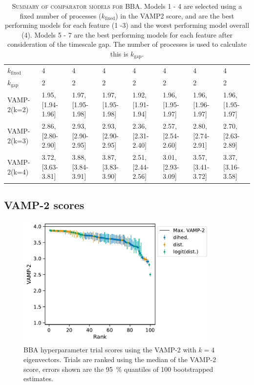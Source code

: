 \documentclass{article}
\begin{document}
\begin{landscape}
\begin{table}
\begin{tabular}{llllllll}
$k_{\mathrm{fixed}}$           &                  4 &                  4 &                  4 &                  4 &                  4 &                  4 &                  4 \\
$k_{\mathrm{gap}}$             &                  2 &                  2 &                  2 &                  2 &                  2 &                  2 &                  2 \\
VAMP-2(k=2)                    &  1.95, [1.94-1.96] &  1.97, [1.95-1.98] &  1.97, [1.95-1.98] &  1.92, [1.91-1.94] &  1.96, [1.95-1.97] &  1.96, [1.96-1.97] &  1.96, [1.95-1.97] \\
VAMP-2(k=3)                    &  2.86, [2.80-2.90] &  2.93, [2.90-2.95] &  2.93, [2.90-2.95] &  2.36, [2.31-2.40] &  2.57, [2.54-2.60] &  2.80, [2.74-2.91] &  2.70, [2.63-2.89] \\
VAMP-2(k=4)                    &  3.72, [3.63-3.81] &  3.88, [3.84-3.91] &  3.87, [3.83-3.90] &  2.51, [2.44-2.56] &  3.01, [2.93-3.09] &  3.57, [3.41-3.72] &  3.37, [3.16-3.58] \\
\bottomrule
\end{tabular}
\caption{\textsc{Summary of comparator models for BBA.} Models 1 - 4 are selected using a fixed number of processes ($k_{\mathrm{fixed}}$) in the VAMP2 score, and are the best performing models for each feature (1 -3) and the worst performing model overall (4).  Models 5 - 7 are the best performing models for each feature after consideration of the timescale gap. The number of processes is used to calculate this is $k_{\mathrm{gap}}$.}
\label{tab:1fme_mod_defs}
\end{table}
\end{landscape}

\clearpage
\subsection{VAMP-2 scores}

\begin{figure}[h]
    \centering
    \includegraphics[width=0.9\textwidth]{figures/vamp_scores/BBA_vamp_scores_ranked.pdf}
    \caption{BBA hyperparameter trial scores using the VAMP-2 with $k=4$ eigenvectors. Trials are ranked using the median of the VAMP-2 score, errors shown are the \SI{95}{\percent} quantiles of 100 bootstrapped estimates.}
    \label{fig:bba_vamp_fixed_k}
\end{figure}
\end{document}
